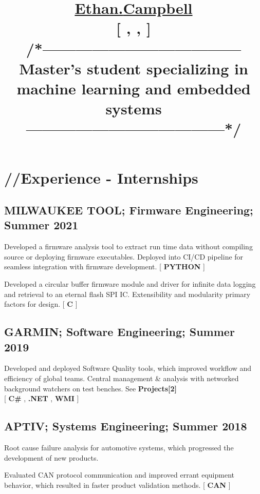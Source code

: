 \documentclass[10pt, letterpaper]{article}
\title{
    \vspace{-10mm}
    {\Huge {\href{https://www.linkedin.com/in/EthanDCampbell}{Ethan.\textbf{Campbell}}}}\\
    {\small 
        [{
            \emphasis{ethan.d.campbell@outlook.com}, \hspace{10pt} 
            \emphasis{(765)438-5553}, \hspace{10pt} 
            \href{http://www.linkedin.com/in/EthanDCampbell}{\emphasis{linkedin.com/in/EthanDCampbell}}
        }]
    }\\
    {\normalsize 
        /*------------------------------------
        Master's student specializing in machine learning and embedded systems
        ------------------------------------*/
    }
}
\date{} %
\newcommand{\emphasis}[1]{
    \textcolor{purduegold}{\textbf{#1}}
}
\newcommand{\Emphasis}[1]{\uppercase{\textbf{#1}}}
\newcommand{\EMPHASIS}[1]{
    \uppercase{\emphasis{#1}}
}
\begin{document}
\maketitle
\vspace{-20mm}
\section*{\huge{//Experience - Internships}}
    \subsection*{\Emphasis{Milwaukee Tool}; \emphasis{Firmware Engineering;} Summer 2021}
        \begin{enumerate}[label={[\arabic*]}]
            \setcounter{enumi}{-1}
            \item Developed a firmware analysis tool to extract run time data without compiling source or deploying firmware executables. Deployed into CI/CD pipeline for seamless integration with firmware development. [{\scriptsize \EMPHASIS{Python}}]
            \item Developed a circular buffer firmware module and driver for infinite data logging and retrieval to an eternal flash SPI IC. Extensibility and modularity primary factors for design. [{\scriptsize\EMPHASIS{C}}]
        \end{enumerate}
    \subsection*{\Emphasis{Garmin}; \emphasis{Software Engineering;} Summer 2019}
        \begin{enumerate}[label={[\arabic*]}]
            \setcounter{enumi}{-1}
            \item Developed and deployed Software Quality tools, which improved workflow and efficiency of global teams. Central management \& analysis with networked background watchers on test benches. See \textbf{Projects[2]}\\ {\scriptsize [\EMPHASIS{C\#}, \EMPHASIS{.NET}, \EMPHASIS{WMI}]}
        \end{enumerate}
    \subsection*{\Emphasis{Aptiv}; \emphasis{Systems Engineering;} Summer 2018}
        \begin{enumerate}[label={[\arabic*]}]
            \setcounter{enumi}{-1}
            \item Root cause failure analysis for automotive systems, which progressed the development of new products. 
            \item Evaluated CAN protocol communication and improved errant equipment behavior, which resulted in faster product validation methods. {\scriptsize [\EMPHASIS{CAN}]}
        \end{enumerate}
\end{document}
